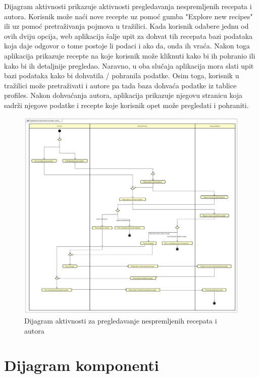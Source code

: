 		\noindent Dijagram aktivnosti prikazuje aktivnosti pregledavanja nespremljenih recepata i autora. Korisnik može naći nove recepte uz pomoć gumba "Explore new recipes" ili uz pomoć pretraživanja pojmova u tražilici. Kada korisnik odabere jednu od ovih dviju opcija, web aplikacija šalje upit za dohvat tih recepata bazi podataka koja daje odgovor o tome postoje li podaci i ako da, onda ih vraća. Nakon toga aplikacija prikazuje recepte na koje korisnik može kliknuti kako bi ih pohranio ili kako bi ih detaljnije pregledao. Naravno, u oba slučaja aplikacija mora slati upit bazi podataka kako bi dohvatila / pohranila podatke. Osim toga, korisnik u tražilici može pretraživati i autore pa tada baza dohvaća podatke iz tablice profiles. Nakon dohvaćanja autora, aplikacija prikazuje njegovu stranicu koja sadrži njegove podatke i recepte koje korisnik opet može pregledati i pohraniti.   

		\eject
			
			\begin{figure}[H]
				\centering
				\includegraphics[width=1\textwidth]{slike/dijagrami/Pregledavanje nespremljenih recepata i autora_dijagram_aktivnosti.png}
				\caption{Dijagram aktivnosti za pregledavanje nespremljenih recepata i autora}
				\label{fig:enter-label}
			\end{figure}
			
			\eject

		\section{Dijagram komponenti}
		

